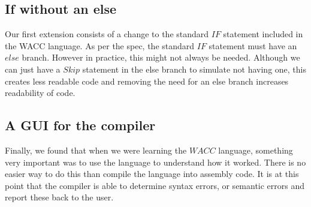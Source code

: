 \documentclass[a4paper, 11pt]{article} %
\begin{document}
\subsection*{If without an else}
Our first extension consists of a change to the standard $ IF $ statement included in the WACC language. As per the spec, the standard $ IF $ statement must have an $ else $ branch. However in practice, this might not always be needed. Although we can just have a $ Skip $ statement in the else branch to simulate not having one, this creates less readable code and removing the need for an else branch increases readability of code.




\subsection*{A GUI for the compiler}

Finally, we found that when we were learning the $ WACC $ language, something very important was to use the language to understand how it worked. There is no easier way to do this than compile the language into assembly code. It is at this point that the compiler is able to determine syntax errors, or semantic errors and report these back to the user.

\end{document}
